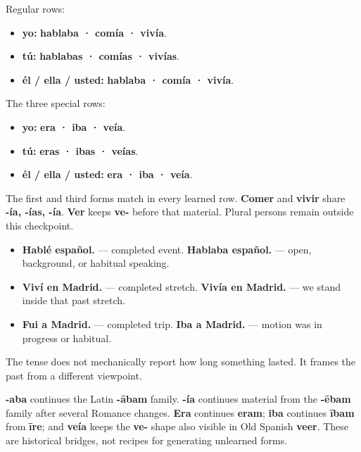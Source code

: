 \begin{grammarlens}[title={Grammar Lens: the complete Chapter 16 frame}]
Regular rows:

\begin{itemize}
\raggedright
  \item \textbf{yo:} \textbf{hablaba · comía · vivía}.
  \item \textbf{tú:} \textbf{hablabas · comías · vivías}.
  \item \textbf{él / ella / usted:} \textbf{hablaba · comía · vivía}.
\end{itemize}

The three special rows:

\begin{itemize}
\raggedright
  \item \textbf{yo:} \textbf{era · iba · veía}.
  \item \textbf{tú:} \textbf{eras · ibas · veías}.
  \item \textbf{él / ella / usted:} \textbf{era · iba · veía}.
\end{itemize}

The first and third forms match in every learned row. \textbf{Comer} and \textbf{vivir} share \textbf{-ía, -ías, -ía}. \textbf{Ver} keeps \textbf{ve-} before that material. Plural persons remain outside this checkpoint.
\end{grammarlens}

\begin{grammarlens}[title={Grammar Lens: one scene, two frames}]
\begin{itemize}
\raggedright
  \item \textbf{Hablé español.} — completed event. \textbf{Hablaba español.} — open, background, or habitual speaking.
  \item \textbf{Viví en Madrid.} — completed stretch. \textbf{Vivía en Madrid.} — we stand inside that past stretch.
  \item \textbf{Fui a Madrid.} — completed trip. \textbf{Iba a Madrid.} — motion was in progress or habitual.
\end{itemize}

The tense does not mechanically report how long something lasted. It frames the past from a different viewpoint.
\end{grammarlens}

\begin{cousinweb}
\textbf{-aba} continues the Latin \textbf{-ābam} family. \textbf{-ía} continues material from the \textbf{-ēbam} family after several Romance changes. \textbf{Era} continues \textbf{eram}; \textbf{iba} continues \textbf{ībam} from \textbf{īre}; and \textbf{veía} keeps the \textbf{ve-} shape also visible in Old Spanish \textbf{veer}. These are historical bridges, not recipes for generating unlearned forms.
\end{cousinweb}

